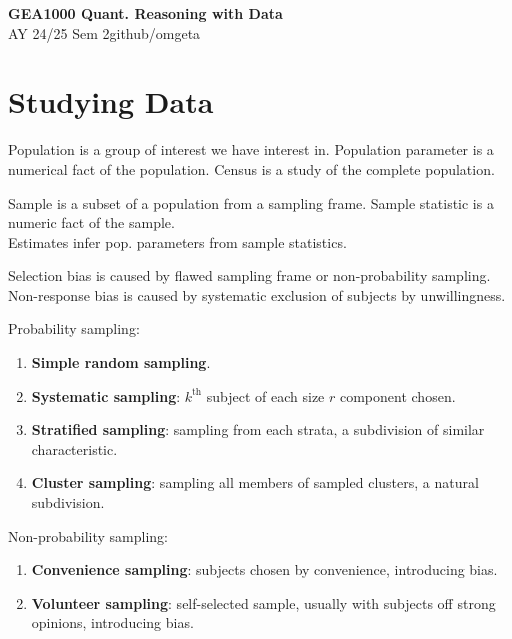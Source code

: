 \documentclass[12pt, a4paper]{article}
\newcommand{\mytitle}{GEA1000 Quant. Reasoning with Data}
\newcommand{\myauthor}{github/omgeta}
\newcommand{\mydate}{AY 24/25 Sem 2}
\begin{document}
\raggedright
\footnotesize
\begin{multicols*}{3}
\setlength{\premulticols}{1pt}
\setlength{\postmulticols}{1pt}
\setlength{\multicolsep}{1pt}
\setlength{\columnsep}{2pt}

{\normalsize{\textbf{\mytitle}}} \\
{\footnotesize{\mydate\hspace{2pt}\textemdash\hspace{2pt}\myauthor}}\vspace{-1pt}
\section{Studying Data}
Population is a group of interest we have interest in. Population parameter is a numerical fact of the population. Census is a study of the complete population.

Sample is a subset of a population from a sampling frame. Sample statistic is a numeric fact of the sample. \\Estimates infer pop. parameters from sample statistics. 

Selection bias is caused by flawed sampling frame or non-probability sampling. Non-response bias is caused by systematic exclusion of subjects by unwillingness.

Probability sampling:
\begin{enumerate}[\roman*.]
  \item \textbf{Simple random sampling}.
  \item \textbf{Systematic sampling}: $k^{\text{th}}$ subject of each size $r$ component chosen.
  \item \textbf{Stratified sampling}: sampling from each strata, a subdivision of similar characteristic.
  \item \textbf{Cluster sampling}: sampling all members of sampled clusters, a natural subdivision.
\end{enumerate}

Non-probability sampling:
\begin{enumerate}[\roman*.]
  \item \textbf{Convenience sampling}: subjects chosen by convenience, introducing bias.
  \item \textbf{Volunteer sampling}: self-selected sample, usually with subjects off strong opinions, introducing bias.
\end{enumerate}


\end{multicols*}
\end{document}
